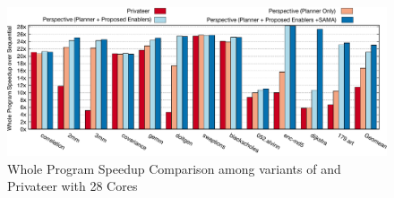 


\begin{figure}[ht]
  \includegraphics[width=\textwidth]{figures/compare-privateer}
  \caption{Whole Program Speedup Comparison among variants of \name and Privateer with 28 Cores}
  \label{fig:speedup-compare}
\end{figure}







